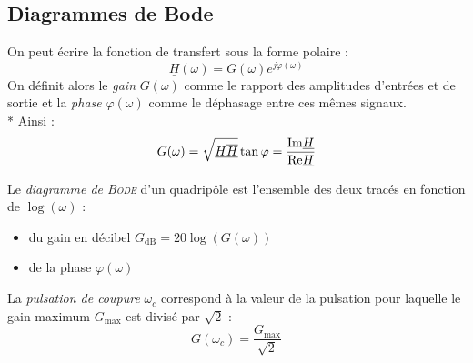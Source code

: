 \documentclass[11pt,a4paper,fleqn,pdftex]{report}
\begin{document}
\subsection{Diagrammes de Bode} %
\label{sub:diagrammes_de_bode}
\begin{dfn}
   On peut écrire la fonction de transfert sous la forme polaire : 
   \[
     \underline{H}(\omega) = G(\omega)e^{j\varphi(\omega)}
   \]
   On définit alors le \emph{gain} $G(\omega)$ comme le rapport des amplitudes d'entrées et de sortie et la \emph{phase} $\varphi(\omega)$ comme le déphasage entre ces mêmes signaux.\\*
   Ainsi : 
   \begin{equation}
   G(\omega) = \sqrt{\underline{H}\overline{\underline{H}}} \\ \tan \varphi = \dfrac{\mathrm{Im}\underline{H}}{\mathrm{Re}\underline{H}}
   \end{equation}
\end{dfn}
\begin{dfn}
   Le \emph{diagramme de \textsc{Bode}} d'un quadripôle est l'ensemble des deux tracés en fonction de $\log (\omega)$ : 
   \begin{itemize}
     \item du gain en décibel $G_\mathrm{dB}=20\log (G(\omega))$
     \item de la phase $\varphi (\omega)$
   \end{itemize}
\end{dfn}
\begin{dfn}
   La \emph{pulsation de coupure} $\omega_c$ correspond à la valeur de la pulsation pour laquelle le gain maximum $G_\text{max}$ est divisé par $\sqrt{2}$ : 
   \begin{equation}
   G(\omega_c) = \dfrac{G_\text{max}}{\sqrt{2}}
   \end{equation}
\end{dfn}
%
\end{document}
